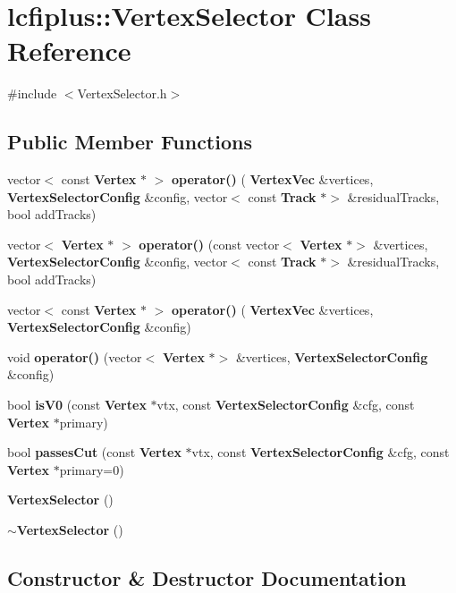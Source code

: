 \section{lcfiplus\+:\+:Vertex\+Selector Class Reference}
\label{classlcfiplus_1_1VertexSelector}


{\ttfamily \#include $<$Vertex\+Selector.\+h$>$}

\subsection*{Public Member Functions}
\begin{DoxyCompactItemize}
\item 
vector$<$ const \textbf{ Vertex} $\ast$ $>$ \textbf{ operator()} (\textbf{ Vertex\+Vec} \&vertices, \textbf{ Vertex\+Selector\+Config} \&config, vector$<$ const \textbf{ Track} $\ast$$>$ \&residual\+Tracks, bool add\+Tracks)
\item 
vector$<$ \textbf{ Vertex} $\ast$ $>$ \textbf{ operator()} (const vector$<$ \textbf{ Vertex} $\ast$$>$ \&vertices, \textbf{ Vertex\+Selector\+Config} \&config, vector$<$ const \textbf{ Track} $\ast$$>$ \&residual\+Tracks, bool add\+Tracks)
\item 
vector$<$ const \textbf{ Vertex} $\ast$ $>$ \textbf{ operator()} (\textbf{ Vertex\+Vec} \&vertices, \textbf{ Vertex\+Selector\+Config} \&config)
\item 
void \textbf{ operator()} (vector$<$ \textbf{ Vertex} $\ast$$>$ \&vertices, \textbf{ Vertex\+Selector\+Config} \&config)
\item 
bool \textbf{ is\+V0} (const \textbf{ Vertex} $\ast$vtx, const \textbf{ Vertex\+Selector\+Config} \&cfg, const \textbf{ Vertex} $\ast$primary)
\item 
bool \textbf{ passes\+Cut} (const \textbf{ Vertex} $\ast$vtx, const \textbf{ Vertex\+Selector\+Config} \&cfg, const \textbf{ Vertex} $\ast$primary=0)
\item 
\textbf{ Vertex\+Selector} ()
\item 
\textbf{ $\sim$\+Vertex\+Selector} ()
\end{DoxyCompactItemize}


\subsection{Constructor \& Destructor Documentation}
\mbox{\label{classlcfiplus_1_1VertexSelector_a848f79f6fd8e13ba52398b104bef9462}} 
